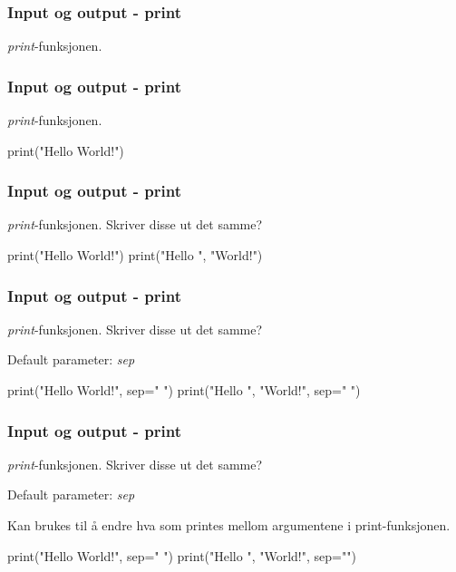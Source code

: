 
\begin{frame}
    \frametitle{Input og output - print}

    \textit{print}-funksjonen. 

\end{frame}

\begin{frame}[fragile]
    \frametitle{Input og output - print}

    \textit{print}-funksjonen. 

\begin{python}
print("Hello World!")
\end{python}

\end{frame}

\begin{frame}[fragile]
    \frametitle{Input og output - print}

    \textit{print}-funksjonen. Skriver disse ut det samme? 

\begin{python}
print("Hello World!")
print("Hello ", "World!")
\end{python}

\end{frame}

\begin{frame}[fragile]
    \frametitle{Input og output - print}

    \textit{print}-funksjonen. Skriver disse ut det samme? 

    Default parameter: \textit{sep}

\begin{python}
print("Hello World!", sep=" ")
print("Hello ", "World!", sep=" ")
\end{python}

\end{frame}

\begin{frame}[fragile]
    \frametitle{Input og output - print}

    \textit{print}-funksjonen. Skriver disse ut det samme? 

    Default parameter: \textit{sep}

    Kan brukes til å endre hva som printes mellom argumentene i print-funksjonen. 

\begin{python}
print("Hello World!", sep=" ")
print("Hello ", "World!", sep="")
\end{python}

\end{frame}

